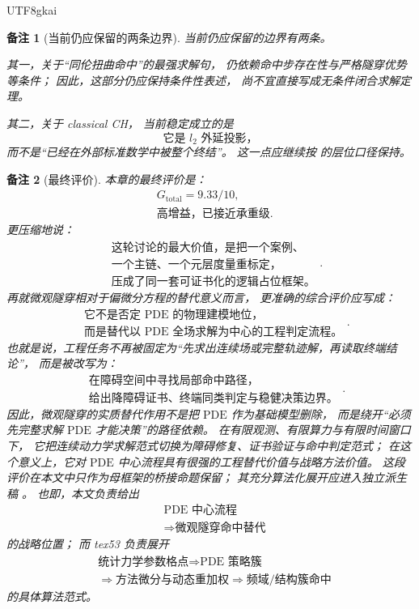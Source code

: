 \documentclass[12pt]{article}
\newtheorem{remark}{备注}[section]
\begin{document}
\begin{CJK*}{UTF8}{gkai}
\begin{remark}[当前仍应保留的两条边界]
当前仍应保留的边界有两条。

其一，关于“同伦扭曲命中”的最强求解句，
仍依赖命中步存在性与严格隧穿优势等条件；
因此，这部分仍应保持条件性表述，
尚不宜直接写成无条件闭合求解定理。

其二，关于 classical CH，
当前稳定成立的是
\[
  \text{它是 }l_2\text{ 外延投影，}
\]
而不是“已经在外部标准数学中被整个终结”。
这一点应继续按 \cite{RepoTex41HomotopyRepairBundle} 的层位口径保持。
\end{remark}

\begin{remark}[最终评价]
本章的最终评价是：
\[
  \boxed{
    \begin{aligned}
      &G_{\mathrm{total}}=9.33/10,\\
      &\text{高增益，已接近承重级}.
    \end{aligned}}
\]
更压缩地说：
\[
  \boxed{
    \begin{aligned}
      &\text{这轮讨论的最大价值，是把一个案例、}\\
      &\text{一个主链、一个元层度量重标定，}\\
      &\text{压成了同一套可证书化的逻辑占位框架。}
    \end{aligned}
  }.
\]
再就微观隧穿相对于偏微分方程的替代意义而言，
更准确的综合评价应写成：
\[
  \boxed{
    \begin{aligned}
      &\text{它不是否定 }\mathrm{PDE}\text{ 的物理建模地位，}\\
      &\text{而是替代以 }\mathrm{PDE}\text{ 全场求解为中心的工程判定流程。}
    \end{aligned}
  }.
\]
也就是说，工程任务不再被固定为“先求出连续场或完整轨迹解，再读取终端结论”，
而是被改写为：
\[
  \boxed{
    \begin{aligned}
      &\text{在障碍空间中寻找局部命中路径，}\\
      &\text{给出降障碍证书、终端同类判定与稳健决策边界。}
    \end{aligned}
  }.
\]
因此，微观隧穿的实质替代作用不是把 \(\mathrm{PDE}\) 作为基础模型删除，
而是绕开“必须先完整求解 \(\mathrm{PDE}\) 才能决策”的路径依赖。
在有限观测、有限算力与有限时间窗口下，
它把连续动力学求解范式切换为障碍修复、证书验证与命中判定范式；
在这个意义上，它对 \(\mathrm{PDE}\) 中心流程具有很强的工程替代价值与战略方法价值。
这段评价在本文中只作为母框架的桥接命题保留；
其充分算法化展开应进入独立派生稿 \cite{RepoTex53PDEStrategyCluster}。
也即，本文负责给出
\[
  \boxed{
    \begin{aligned}
      &\text{PDE 中心流程}\\
      &\Longrightarrow
      \text{微观隧穿命中替代}
    \end{aligned}
  }
\]
的战略位置；
而 tex53 负责展开
\[
  \boxed{
    \begin{aligned}
      &\text{统计力学参数格点}
      \Longrightarrow
      \text{PDE 策略簇}\\
      &\Longrightarrow
      \text{方法微分与动态重加权}
      \Longrightarrow
      \text{频域/结构簇命中}
    \end{aligned}
  }
\]
的具体算法范式。
\end{remark}
\clearpage


\end{CJK*}
\end{document}
